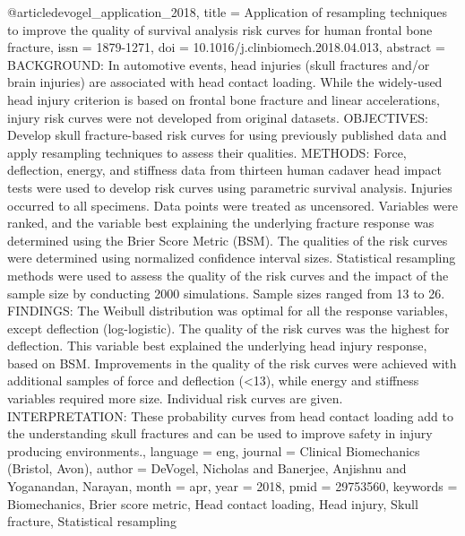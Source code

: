 @article{devogel_application_2018,
	title = {Application of resampling techniques to improve the quality of survival analysis risk curves for human frontal bone fracture},
	issn = {1879-1271},
	doi = {10.1016/j.clinbiomech.2018.04.013},
	abstract = {BACKGROUND: In automotive events, head injuries (skull fractures and/or brain injuries) are associated with head contact loading. While the widely-used head injury criterion is based on frontal bone fracture and linear accelerations, injury risk curves were not developed from original datasets.
OBJECTIVES: Develop skull fracture-based risk curves for using previously published data and apply resampling techniques to assess their qualities.
METHODS: Force, deflection, energy, and stiffness data from thirteen human cadaver head impact tests were used to develop risk curves using parametric survival analysis. Injuries occurred to all specimens. Data points were treated as uncensored. Variables were ranked, and the variable best explaining the underlying fracture response was determined using the Brier Score Metric (BSM). The qualities of the risk curves were determined using normalized confidence interval sizes. Statistical resampling methods were used to assess the quality of the risk curves and the impact of the sample size by conducting 2000 simulations. Sample sizes ranged from 13 to 26.
FINDINGS: The Weibull distribution was optimal for all the response variables, except deflection (log-logistic). The quality of the risk curves was the highest for deflection. This variable best explained the underlying head injury response, based on BSM. Improvements in the quality of the risk curves were achieved with additional samples of force and deflection ({\textless}13), while energy and stiffness variables required more size. Individual risk curves are given.
INTERPRETATION: These probability curves from head contact loading add to the understanding skull fractures and can be used to improve safety in injury producing environments.},
	language = {eng},
	journal = {Clinical Biomechanics (Bristol, Avon)},
	author = {DeVogel, Nicholas and Banerjee, Anjishnu and Yoganandan, Narayan},
	month = apr,
	year = {2018},
	pmid = {29753560},
	keywords = {Biomechanics, Brier score metric, Head contact loading, Head injury, Skull fracture, Statistical resampling}
}

